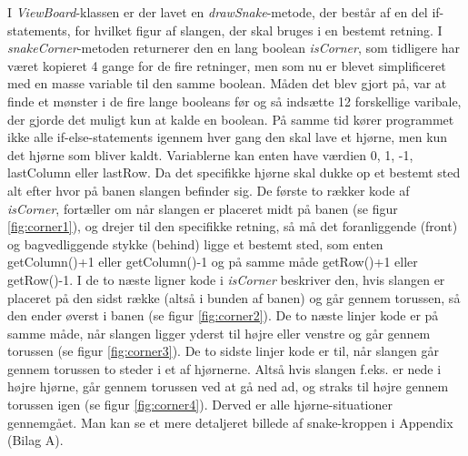 \documentclass{report}
\begin{document}
I \textit{ViewBoard}-klassen er der lavet en \textit{drawSnake}-metode, der består af en del if-statements, for hvilket figur af slangen, der skal bruges i en bestemt retning. I \textit{snakeCorner}-metoden returnerer den en lang boolean \textit{isCorner}, som tidligere har været kopieret 4 gange for de fire retninger, men som nu er blevet simplificeret med en masse variable til den samme boolean. Måden det blev gjort på, var at finde et mønster i de fire lange booleans før og så indsætte 12 forskellige varibale, der gjorde det muligt kun at kalde en boolean. På samme tid kører programmet ikke alle if-else-statements igennem hver gang den skal lave et hjørne, men kun det hjørne som bliver kaldt. Variablerne kan enten have værdien 0, 1, -1, lastColumn eller lastRow. Da det specifikke hjørne skal dukke op et bestemt sted alt efter hvor på banen slangen befinder sig.
De første to rækker kode af \textit{isCorner}, fortæller om når slangen er placeret midt på banen (se figur \ref{fig:corner1}), og drejer til den specifikke retning, så må det foranliggende (front) og bagvedliggende stykke (behind) ligge et bestemt sted, som enten getColumn()+1 eller getColumn()-1 og på samme måde getRow()+1 eller getRow()-1. I de to næste ligner kode i \textit{isCorner} beskriver den, hvis slangen er placeret på den sidst række (altså i bunden af banen) og går gennem torussen, så den ender øverst i banen (se figur \ref{fig:corner2}).
De to næste linjer kode er på samme måde, når slangen ligger yderst til højre eller venstre og går gennem torussen (se figur \ref{fig:corner3}).
De to sidste linjer kode er til, når slangen går gennem torussen to steder i et af hjørnerne. Altså hvis slangen f.eks. er nede i højre hjørne, går gennem torussen ved at gå ned ad, og straks til højre gennem torussen igen (se figur \ref{fig:corner4}). 
Derved er alle hjørne-situationer gennemgået.
Man kan se et mere detaljeret billede af snake-kroppen i Appendix (Bilag A).
\end{document}
